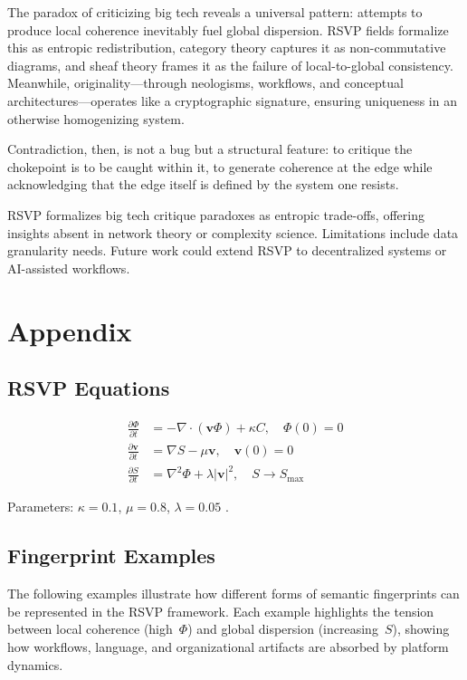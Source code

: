 \documentclass{article}
\begin{document}
The paradox of criticizing big tech reveals a universal pattern: attempts to produce local coherence inevitably fuel global dispersion. RSVP fields formalize this as entropic redistribution, category theory captures it as non-commutative diagrams, and sheaf theory frames it as the failure of local-to-global consistency. Meanwhile, originality—through neologisms, workflows, and conceptual architectures—operates like a cryptographic signature, ensuring uniqueness in an otherwise homogenizing system.

Contradiction, then, is not a bug but a structural feature: to critique the chokepoint is to be caught within it, to generate coherence at the edge while acknowledging that the edge itself is defined by the system one resists.

RSVP formalizes big tech critique paradoxes as entropic trade-offs, offering insights absent in network theory or complexity science. Limitations include data granularity needs. Future work could extend RSVP to decentralized systems or AI-assisted workflows.

\section{Appendix}

\subsection{RSVP Equations}

\begin{align}
    \frac{\partial \Phi}{\partial t} &= -\nabla \cdot (\mathbf{v} \Phi) + \kappa C, \quad \Phi(0) = 0 \label{eq:phi} \\
    \frac{\partial \mathbf{v}}{\partial t} &= \nabla S - \mu \mathbf{v}, \quad \mathbf{v}(0) = 0 \label{eq:v} \\
    \frac{\partial S}{\partial t} &= \nabla^2 \Phi + \lambda |\mathbf{v}|^2, \quad S \to S_{\text{max}} \label{eq:s}
\end{align}

Parameters: $\kappa = 0.1$, $\mu = 0.8$, $\lambda = 0.05$ \cite{x2025}.

\subsection{Fingerprint Examples}

The following examples illustrate how different forms of semantic fingerprints can be represented in the RSVP framework. Each example highlights the tension between local coherence (high~$\Phi$) and global dispersion (increasing~$S$), showing how workflows, language, and organizational artifacts are absorbed by platform dynamics.
\end{document}
